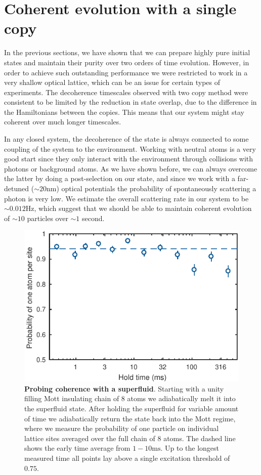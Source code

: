 \section{Coherent evolution with a single copy}
In the previous sections, we have shown that we can prepare highly pure initial states and maintain their purity over two orders of time evolution. However, in order to achieve such outstanding performance we were restricted to work in a very shallow optical lattice, which can be an issue for certain types of experiments. The decoherence timescales observed with two copy method were consistent to be limited by the reduction in state overlap, due to the difference in the Hamiltonians between the copies. This means that our system might stay coherent over much longer timescales.

In any closed system, the decoherence of the state is always connected to some coupling of the system to the environment. Working with neutral atoms is a very good start since they only interact with the environment through collisions with photons or background atoms. As we have shown before, we can always overcome the latter by doing a post-selection on our state, and since we work with a far-detuned ($\sim 20 \mathrm{nm}$) optical potentials the probability of spontaneously scattering a photon is very low. We estimate the overall scattering rate in our system to be $\sim 0.012 \mathrm{Hz}$, which suggest that we should be able to maintain coherent evolution of $\sim 10$ particles over $\sim 1$ second.

\begin{figure}[t]
	\centering
	\includegraphics[scale=1]{figures/CBH_melt_and_back_p1.pdf}
	\caption{{\bf Probing coherence with a superfluid}. Starting with a unity filling Mott insulating chain of 8 atoms we adiabatically melt it into the superfluid state. After holding the superfluid for variable amount of time we adiabatically return the state back into the Mott regime, where we measure the probability of one particle on individual lattice sites averaged over the full chain of $8$ atoms. The dashed line shows the early time average from $1-10\mathrm{ms}$. Up to the longest measured time all points lay above a single excitation threshold of $0.75$.} 
	\label{fig:CBH_melt_and_back}
\end{figure}

